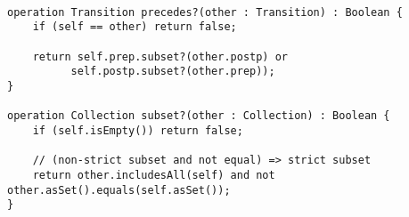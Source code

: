 \tt
\begin{lstlisting}
operation Transition precedes?(other : Transition) : Boolean {
	if (self == other) return false;
	
	return self.prep.subset?(other.postp) or
          self.postp.subset?(other.prep));
}

operation Collection subset?(other : Collection) : Boolean {
	if (self.isEmpty()) return false;

	// (non-strict subset and not equal) => strict subset
	return other.includesAll(self) and not other.asSet().equals(self.asSet());
}
\end{lstlisting}